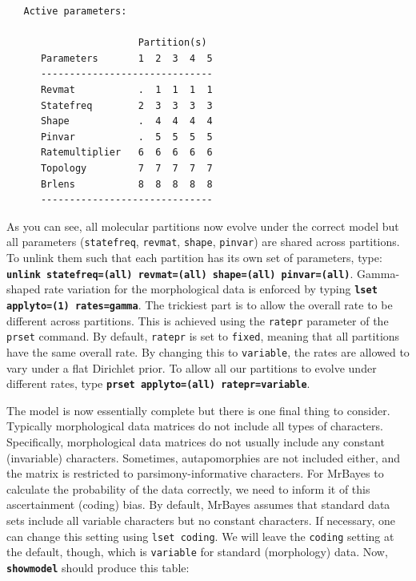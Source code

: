 \documentclass[12pt]{book}
\newcommand{\ttt}[1]{\texttt{#1}}
\newcommand{\tb}[1]{\ttt{\textbf{#1}}}
\begin{document}
\begin{singlespacing}
\footnotesize
\begin{verbatim}
   Active parameters:
 
                       Partition(s)
      Parameters       1  2  3  4  5
      ------------------------------
      Revmat           .  1  1  1  1
      Statefreq        2  3  3  3  3
      Shape            .  4  4  4  4
      Pinvar           .  5  5  5  5
      Ratemultiplier   6  6  6  6  6
      Topology         7  7  7  7  7
      Brlens           8  8  8  8  8
      ------------------------------
\end{verbatim}
\normalsize
\end{singlespacing}

As you can see, all molecular partitions now evolve under the correct model but all parameters
(\ttt{statefreq}, \ttt{revmat}, \ttt{shape}, \ttt{pinvar}) are shared across partitions. To unlink
them such that each partition has its own set of parameters, type: \tb{unlink statefreq=(all)
revmat=(all) shape=(all) pinvar=(all)}. Gamma-shaped rate variation for the morphological data is
enforced by typing \tb{lset applyto=(1) rates=gamma}. The trickiest part is to allow the overall
rate to be different across partitions. This is achieved using the \ttt{ratepr} parameter of the
\ttt{prset} command. By default, \ttt{ratepr} is set to \ttt{fixed}, meaning that all partitions
have the same overall rate. By changing this to \ttt{variable}, the rates are allowed to vary under
a flat Dirichlet prior. To allow all our partitions to evolve under different rates, type \tb{prset
applyto=(all) ratepr=variable}.

The model is now essentially complete but there is one final thing to consider. Typically
morphological data matrices do not include all types of characters. Specifically, morphological
data matrices do not usually include any constant (invariable) characters. Sometimes,
autapomorphies are not included either, and the matrix is restricted to parsimony-informative
characters. For MrBayes to calculate the probability of the data correctly, we need to inform it of
this ascertainment (coding) bias. By default, MrBayes assumes that standard data sets include all
variable characters but no constant characters. If necessary, one can change this setting using
\ttt{lset coding}. We will leave the \ttt{coding} setting at the default, though, which is
\ttt{variable} for standard (morphology) data. Now, \tb{showmodel} should produce this table:
\end{document}
